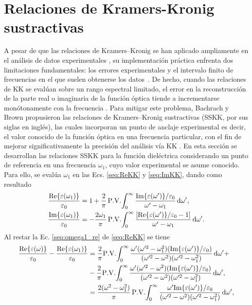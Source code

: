 \section{Relaciones de Kramers-Kronig sustractivas}
\label{section:SSKK}
\vspace{-0.4cm}

A pesar de que las relaciones de Kramers–Kronig se han aplicado ampliamente en el análisis de datos experimentales \cite{nakovUnifiedFrameworkNumerical2023}, su implementación práctica enfrenta dos limitaciones fundamentales: los errores experimentales y el intervalo finito de frecuencias en el que suelen obtenerse los datos~\cite{nakovUnifiedFrameworkNumerical2023}. De hecho, cuando las relaciones de KK se evalúan sobre un rango espectral limitado, el error en la reconstrucción de la parte real o imaginaria de la función óptica tiende a incrementarse monótonamente con la frecuencia \cite{miltonFiniteFrequencyRange1997}. Para mitigar este problema, Bachrach y Brown \cite{bachrachExcitonOpticalPropertiesTlBr1970} propusieron las relaciones de Kramers–Kronig sustractivas (SSKK, por sus siglas en inglés), las cuales incorporan un punto de anclaje experimental es decir, el valor conocido de la función óptica en una frecuencia particular, con el fin de mejorar significativamente la precisión del análisis vía KK \cite{lucariniKramersKronigRelationsOptical2005}. En esta sección se desarrollan las relaciones SSKK para la función dieléctrica considerando un punto de referencia en una frecuencia $\omega_1$, cuyo valor experimental se asume conocido. Para ello, se evalúa $\omega_1$ en las Ecs. \eqref{seq:ReKK} y \eqref{seq:ImKK}, dando como resultado
%
\begin{align}
		\frac{\text{Re}\{\varepsilon(\omega_1)\}}{\varepsilon_0}&=1+\frac{2}{\pi}\,\PV{\int_{0}^{\infty}\frac{\text{Im}\{\varepsilon(\omega')\}/\varepsilon_0}{\omega'-\omega_1}\dd{\omega'}}, \label{seq:omega1_re}\\
		\frac{\text{Im}\{\varepsilon(\omega_1)\}}{\varepsilon_0}&=-\frac{2\omega_1}{\pi}\,\PV{\int_{0}^{\infty}\frac{[\text{Re}\{\varepsilon(\omega')\}/\varepsilon_0-1]}{\omega'-\omega_1}\dd{\omega'}}.\label{seq:omega1_im}	
\end{align}
%
Al restar la Ec. \eqref{seq:omega1_re} de \eqref{seq:ReKK} se tiene %
%
\begin{align}
	\frac{\text{Re}\{\varepsilon(\omega)\}}{\varepsilon_0}-\frac{\text{Re}\{\varepsilon(\omega_1)\}}{\varepsilon_0}&=\frac{2}{\pi}\PV{\int_{0}^{\infty} \frac{\omega'(\omega'^2-\omega_1^2)(\text{Im}\{\varepsilon(\omega')\}/\varepsilon_0)}{(\omega'^2-\omega^2)(\omega'^2-\omega_1^2)}\dd{\omega'}}+\nonumber\\
	&-\frac{2}{\pi}\PV{\int_{0}^{\infty} \frac{\omega'(\omega'^2-\omega^2)(\text{Im}\{\varepsilon(\omega')\}/\varepsilon_0)}{(\omega'^2-\omega^2)(\omega'^2-\omega_1^2)}\dd{\omega'}},\nonumber\\
	&=\frac{2(\omega^2-\omega_1^2)}{\pi}\,\PV{\int_{0}^{\infty}\frac{\omega'\text{Im}\{\varepsilon(\omega')\}/\varepsilon_0}{(\omega'^2-\omega^2)(\omega'^2-\omega_1^2)}\dd{\omega'}},\label{seq:SSKKRe0}
\end{align}
%

